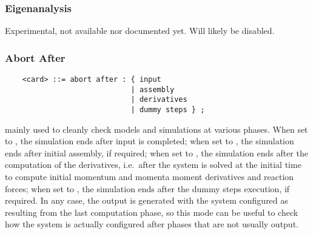 \subsubsection{Eigenanalysis}
Experimental, not available nor documented yet.
Will likely be disabled.

\subsubsection{Abort After}
\begin{verbatim}
    <card> ::= abort after : { input 
                             | assembly 
                             | derivatives 
                             | dummy steps } ;
\end{verbatim}
mainly used to cleanly check models and simulations at various phases.
When set to , the simulation ends after input is completed;
when set to , the simulation ends after initial assembly,
if required;
when set to , the simulation ends after the computation
of the derivatives, i.e.\ after the system is solved at the initial
time to compute initial momentum and momenta moment derivatives and 
reaction forces;
when set to , the simulation ends after the dummy steps
execution, if required.
In any case, the output is generated with the system configured 
as resulting from the last computation phase, so this mode can be useful 
to check how the system is actually configured after phases that are not 
usually output.


